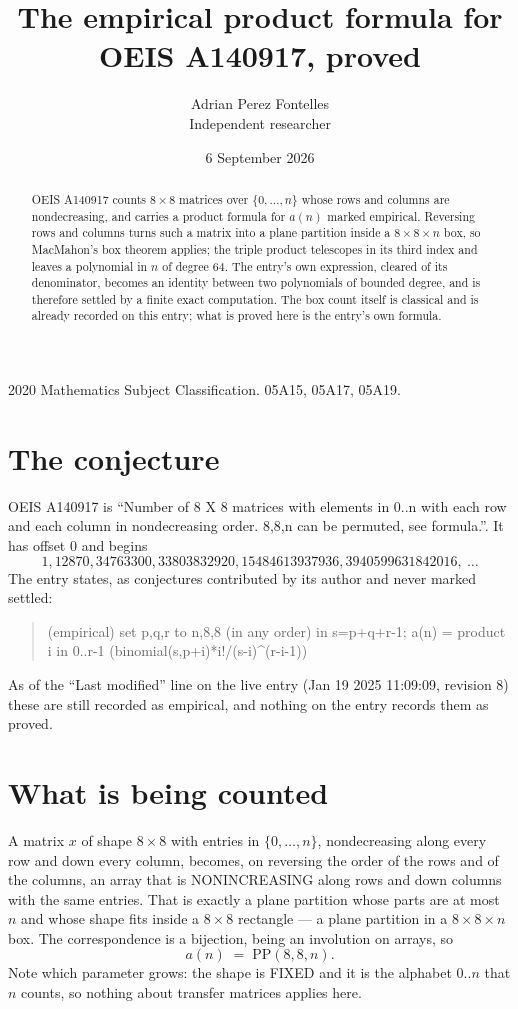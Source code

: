 \documentclass[11pt,a4paper]{article}
\title{The empirical product formula for OEIS A140917, proved}
\author{Adrian Perez Fontelles\\ \small Independent researcher}
\date{6 September 2026}
\theoremstyle{plain}
\theoremstyle{definition}
\begin{document}
\maketitle

\begin{abstract}
OEIS A140917 counts $8\times8$ matrices over $\{0,\dots,n\}$ whose rows and columns are
nondecreasing, and carries a product formula for $a(n)$ marked empirical. Reversing rows and
columns turns such a matrix into a plane partition inside a $8\times8\times n$ box, so
MacMahon's box theorem applies; the triple product telescopes in its third index and leaves a
polynomial in $n$ of degree $64$. The entry's own expression, cleared of its denominator,
becomes an identity between two polynomials of bounded degree, and is therefore settled by a
finite exact computation. The box count itself is classical and is already recorded on this
entry; what is proved here is the entry's own formula.
\end{abstract}

\noindent\small 2020 Mathematics Subject Classification. 05A15, 05A17, 05A19.\normalsize

\section{The conjecture}

OEIS A140917 is ``Number of 8 X 8 matrices with elements in 0..n with each row and each column in nondecreasing order. 8,8,n can be permuted, see formula.''. It has offset $0$ and begins
\[
1, 12870, 34763300, 33803832920, 15484613937936, 3940599631842016,\ \dots
\]
The entry states, as conjectures contributed by its author and never marked settled:
\begin{quote}
(empirical) set p,q,r to n,8,8 (in any order) in s=p+q+r-1; a(n) = product {i in 0..r-1} (binomial(s,p+i)*i!/(s-i)\^{}(r-i-1))

\end{quote}
As of the ``Last modified'' line on the live entry (Jan 19 2025 11:09:09, revision 8) these are still
recorded as empirical, and nothing on the entry records them as proved.

\section{What is being counted}

A matrix $x$ of shape $8\times8$ with entries in $\{0,\dots,n\}$, nondecreasing along
every row and down every column, becomes, on reversing the order of the rows and of the
columns, an array that is NONINCREASING along rows and down columns with the same entries. That
is exactly a plane partition whose parts are at most $n$ and whose shape fits inside a
$8\times8$ rectangle --- a plane partition in a $8\times8\times n$ box. The
correspondence is a bijection, being an involution on arrays, so
\[
a(n)\;=\;\mathrm{PP}(8,8,n).
\]
Note which parameter grows: the shape is FIXED and it is the alphabet $0..n$ that $n$ counts,
so nothing about transfer matrices applies here.
\end{document}
